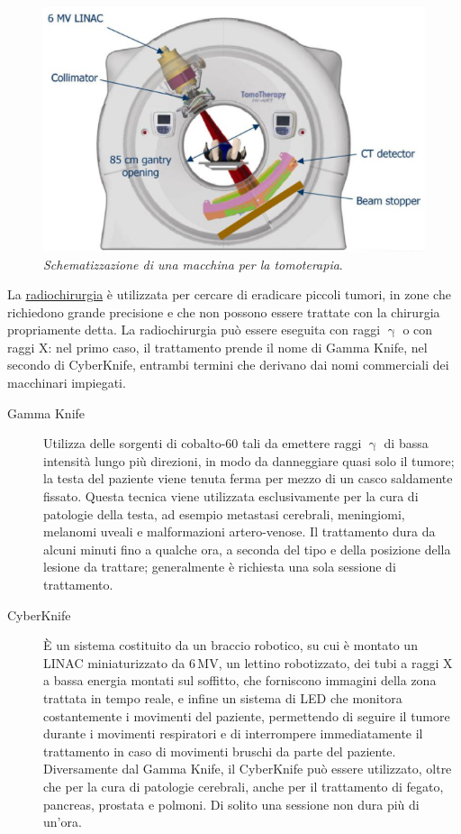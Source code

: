 \documentclass{report}
\numberwithin{equation}{section}
\numberwithin{figure}{section}
\begin{document}
\begin{figure}[htp]
\centering
\includegraphics[scale=0.78]{immagini/tomoterapia.png}
\caption{\label{fig:tomoterapia} \textit{Schematizzazione di una macchina per la tomoterapia}.}
\end{figure}

La \underline{radiochirurgia} è utilizzata per cercare di eradicare piccoli tumori, in zone che richiedono grande precisione e che non possono essere trattate con la chirurgia propriamente detta. La radiochirurgia può essere eseguita con raggi $\upgamma$ o con raggi X: nel primo caso, il trattamento prende il nome di Gamma Knife, nel secondo di CyberKnife, entrambi termini che derivano dai nomi commerciali dei macchinari impiegati.
\begin{description}
    \item[Gamma Knife] Utilizza delle sorgenti di cobalto-60 tali da emettere raggi $\upgamma$ di bassa intensità lungo più direzioni, in modo da danneggiare quasi solo il tumore; la testa del paziente viene tenuta ferma per mezzo di un casco saldamente fissato. Questa tecnica viene utilizzata esclusivamente per la cura di patologie della testa, ad esempio metastasi cerebrali, meningiomi, melanomi uveali e malformazioni artero-venose. Il trattamento dura da alcuni minuti fino a qualche ora, a seconda del tipo e della posizione della lesione da trattare; generalmente è richiesta una sola sessione di trattamento.
    \item[CyberKnife] È un sistema costituito da un braccio robotico, su cui è montato un LINAC miniaturizzato da 6\,MV, un lettino robotizzato, dei tubi a raggi X a bassa energia montati sul soffitto, che forniscono immagini della zona trattata in tempo reale, e infine un sistema di LED che monitora costantemente i movimenti del paziente, permettendo di seguire il tumore durante i movimenti respiratori e di interrompere immediatamente il trattamento in caso di movimenti bruschi da parte del paziente. Diversamente dal Gamma Knife, il CyberKnife può essere utilizzato, oltre che per la cura di patologie cerebrali, anche per il trattamento di fegato, pancreas, prostata e polmoni. Di solito una sessione non dura più di un'ora.
\end{description}
\end{document}
